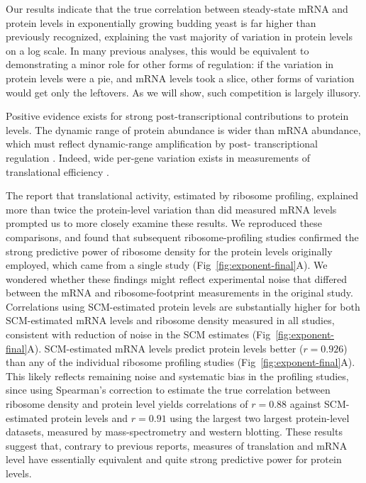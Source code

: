 \documentclass[10pt]{article}
\begin{document}
Our results indicate that the true correlation between steady-state mRNA and
protein levels in exponentially growing budding yeast is far higher than
previously recognized, explaining the vast majority of variation in protein
levels on a log scale. In many previous analyses, this would be equivalent to
demonstrating a minor role for other forms of regulation: if the variation in
protein levels were a pie, and mRNA levels took a slice, other forms of
variation would get only the leftovers. As we will
show, such competition is largely illusory.

Positive evidence exists for strong post-transcriptional contributions to protein levels. The dynamic range of protein abundance
is wider than mRNA abundance, which must reflect dynamic-range amplification by post-
transcriptional regulation \cite{vogel12}. Indeed, wide per-gene variation
exists in measurements of translational efficiency \cite{ingolia09,gerashchenko12, Gerashchenko2014}.

The report that translational activity, estimated
by ribosome profiling, explained more than twice the protein-level
variation than did measured mRNA levels \cite{ingolia09} prompted
us to more closely examine these results. We reproduced these comparisons, and found that subsequent ribosome-profiling studies \cite{gerashchenko12,Gerashchenko2014,McManus2014,Subtelny2014} confirmed the strong predictive power of ribosome density for the protein levels originally employed, which came from a single study \cite{degodoy08} (Fig~\ref{fig:exponent-final}A). 
We wondered whether these findings might reflect experimental noise that differed between the mRNA and ribosome-footprint measurements in the original study. Correlations
using SCM-estimated protein levels are substantially higher for both
SCM-estimated mRNA levels and ribosome density measured in all studies, consistent with reduction of noise in the SCM estimates (Fig~\ref{fig:exponent-final}A). SCM-estimated mRNA levels predict protein levels better ($r=0.926$) than any of the individual ribosome profiling studies (Fig~\ref{fig:exponent-final}A). 
This likely reflects remaining noise and systematic bias in the profiling studies, since using Spearman's correction to estimate the true correlation between ribosome density and protein level yields correlations of $r=0.88$ against SCM-estimated protein levels and $r=0.91$ using the largest two largest protein-level datasets, measured by mass-spectrometry and western blotting.
These results suggest that, contrary to previous reports, measures of translation and mRNA level have essentially equivalent and quite strong predictive power for protein levels.
\end{document}
